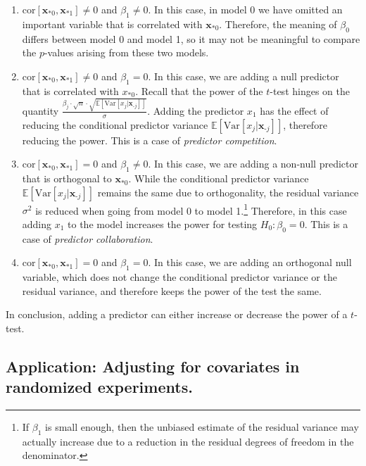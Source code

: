 \documentclass[
  11pt,
  letterpaper,
  oneside]{book}
\providecommand{\tightlist}{%
  \setlength{\itemsep}{0pt}\setlength{\parskip}{0pt}}\usepackage{longtable,booktabs,array}
\theoremstyle{plain}
\theoremstyle{plain}
\theoremstyle{definition}
\theoremstyle{definition}
\theoremstyle{plain}
\theoremstyle{remark}
\begin{document}
\begin{enumerate}
\def\labelenumi{\arabic{enumi}.}
\tightlist
\item
  \(\text{cor}[\boldsymbol{x}_{*0}, \boldsymbol{x}_{*1}] \neq 0\) and
  \(\beta_1 \neq 0\). In this case, in model 0 we have omitted an
  important variable that is correlated with \(\boldsymbol{x}_{*0}\).
  Therefore, the meaning of \(\beta_0\) differs between model 0 and
  model 1, so it may not be meaningful to compare the \(p\)-values
  arising from these two models.
\item
  \(\text{cor}[\boldsymbol{x}_{*0}, \boldsymbol{x}_{*1}] \neq 0\) and
  \(\beta_1 = 0\). In this case, we are adding a null predictor that is
  correlated with \(x_{*0}\). Recall that the power of the \(t\)-test
  hinges on the quantity
  \(\frac{\beta_j \cdot \sqrt{n} \cdot \sqrt{\mathbb{E}[\text{Var}[x_j|\boldsymbol{x}_{\text{-}j}]]}}{\sigma}\).
  Adding the predictor \(x_1\) has the effect of reducing the
  conditional predictor variance
  \(\mathbb{E}[\text{Var}[x_j|\boldsymbol{x}_{\text{-}j}]]\), therefore
  reducing the power. This is a case of \emph{predictor competition}.
\item
  \(\text{cor}[\boldsymbol{x}_{*0}, \boldsymbol{x}_{*1}] = 0\) and
  \(\beta_1 \neq 0\). In this case, we are adding a non-null predictor
  that is orthogonal to \(\boldsymbol{x}_{*0}\). While the conditional
  predictor variance
  \(\mathbb{E}[\text{Var}[x_j|\boldsymbol{x}_{\text{-}j}]]\) remains the
  same due to orthogonality, the residual variance \(\sigma^2\) is
  reduced when going from model 0 to model
  1.\footnote{If $\beta_1$ is small enough, then the unbiased estimate of the residual variance may actually increase due to a reduction in the residual degrees of freedom in the denominator.}
  Therefore, in this case adding \(x_1\) to the model increases the
  power for testing \(H_0: \beta_0 = 0\). This is a case of
  \emph{predictor collaboration}.
\item
  \(\text{cor}[\boldsymbol{x}_{*0}, \boldsymbol{x}_{*1}] = 0\) and
  \(\beta_1 = 0\). In this case, we are adding an orthogonal null
  variable, which does not change the conditional predictor variance or
  the residual variance, and therefore keeps the power of the test the
  same.
\end{enumerate}

In conclusion, adding a predictor can either increase or decrease the
power of a \(t\)-test.

\hypertarget{application-adjusting-for-covariates-in-randomized-experiments.}{%
\subsection{Application: Adjusting for covariates in randomized
experiments.}\label{application-adjusting-for-covariates-in-randomized-experiments.}}
\end{document}
